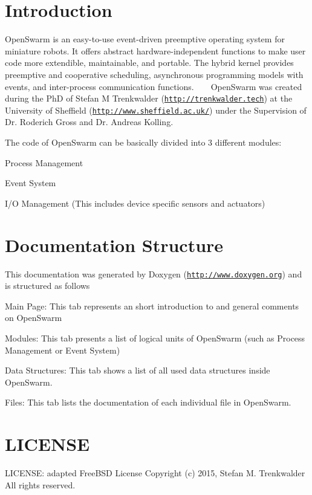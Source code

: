 \hypertarget{index_intro_sec}{}\section{Introduction}\label{index_intro_sec}
Open\+Swarm is an easy-\/to-\/use event-\/driven preemptive operating system for miniature robots. It offers abstract hardware-\/independent functions to make user code more extendible, maintainable, and portable. The hybrid kernel provides preemptive and cooperative scheduling, asynchronous programming models with events, and inter-\/process communication functions. ~\newline
~\newline
 Open\+Swarm was created during the Ph\+D of Stefan M Trenkwalder (\href{http://trenkwalder.tech}{\tt http\+://trenkwalder.\+tech}) at the University of Sheffield (\href{http://www.sheffield.ac.uk/}{\tt http\+://www.\+sheffield.\+ac.\+uk/}) under the Supervision of Dr. Roderich Gross and Dr. Andreas Kolling.

The code of Open\+Swarm can be basically divided into 3 different modules\+:
\begin{DoxyItemize}
\item Process Management
\item Event System
\item I/\+O Management (This includes device specific sensors and actuators)
\end{DoxyItemize}\hypertarget{index_brief_dec}{}\section{Documentation Structure}\label{index_brief_dec}
This documentation was generated by Doxygen (\href{http://www.doxygen.org}{\tt http\+://www.\+doxygen.\+org}) and is structured as follows
\begin{DoxyItemize}
\item Main Page\+: This tab represents an short introduction to and general comments on Open\+Swarm
\item Modules\+: This tab presents a list of logical units of Open\+Swarm (such as Process Management or Event System)
\item Data Structures\+: This tab shows a list of all used data structures inside Open\+Swarm.
\item Files\+: This tab lists the documentation of each individual file in Open\+Swarm.
\end{DoxyItemize}\hypertarget{index_LICENSE}{}\section{L\+I\+C\+E\+N\+S\+E}\label{index_LICENSE}
L\+I\+C\+E\+N\+S\+E\+: adapted Free\+B\+S\+D License Copyright (c) 2015, Stefan M. Trenkwalder All rights reserved.

